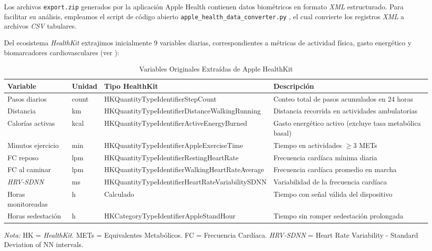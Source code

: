 Los archivos \texttt{export.zip} generados por la aplicación Apple Health contienen datos biométricos en formato \textit{XML} estructurado. Para facilitar su análisis, empleamos el script de código abierto \texttt{apple\_health\_data\_converter.py} \cite{Gaur2024AppleHealth}, el cual convierte los registros \textit{XML} a archivos \textit{CSV} tabulares.

Del ecosistema \textit{HealthKit} extrajimos inicialmente 9 variables diarias, correspondientes a métricas de actividad física, gasto energético y biomarcadores cardiovasculares (ver ):

\begin{table}[htbp]
\centering
\caption{Variables Originales Extraídas de Apple HealthKit}
\label{tab:variables_originales_apple_health}
\small
\begin{tabular}{@{}p{3.2cm}p{1.2cm}p{4cm}p{5cm}@{}}
\toprule
\textbf{Variable} & \textbf{Unidad} & \textbf{Tipo HealthKit} & \textbf{Descripción} \\
\midrule
Pasos diarios & count & HKQuantityTypeIdentifier\-StepCount & Conteo total de pasos acumulados en 24 horas \\
Distancia & km & HKQuantityTypeIdentifier\-DistanceWalkingRunning & Distancia recorrida en actividades ambulatorias \\
Calorías activas & kcal & HKQuantityTypeIdentifier\-ActiveEnergyBurned & Gasto energético activo (excluye tasa metabólica basal) \\
Minutos ejercicio & min & HKQuantityTypeIdentifier\-AppleExerciseTime & Tiempo en actividades $\geq$3 METs \\
FC reposo & lpm & HKQuantityTypeIdentifier\-RestingHeartRate & Frecuencia cardíaca mínima diaria \\
FC al caminar & lpm & HKQuantityTypeIdentifier\-WalkingHeartRateAverage & Frecuencia cardíaca promedio en marcha \\
\textit{HRV-SDNN} & ms & HKQuantityTypeIdentifier\-HeartRateVariabilitySDNN & Variabilidad de la frecuencia cardíaca \\
Horas monitoreadas & h & Calculado & Tiempo con señal válida del dispositivo \\
Horas sedestación & h & HKCategoryTypeIdentifier\-AppleStandHour & Tiempo sin romper sedestación prolongada \\
\bottomrule
\end{tabular}
\begin{flushleft}
\scriptsize
\textit{Nota:} HK = \textit{HealthKit}. METs = Equivalentes Metabólicos. FC = Frecuencia Cardíaca. \textit{HRV-SDNN} = Heart Rate Variability - Standard Deviation of NN intervals.
\end{flushleft}
\end{table}

